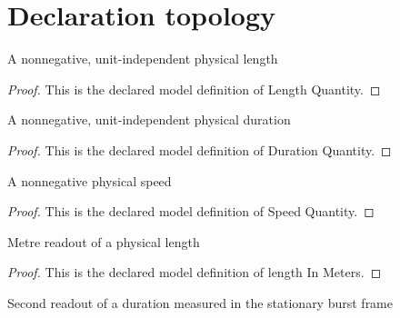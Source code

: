 \section{Declaration topology}
\begin{definition}
  \label{def:physics:phyx-mini-0594:phyxminiproblems-problemphyxmini0594-lengthquantity}
  A nonnegative, unit-independent physical length
\end{definition}
\begin{proof}
  This is the declared model definition of Length Quantity.
\end{proof}
\begin{definition}
  \label{def:physics:phyx-mini-0594:phyxminiproblems-problemphyxmini0594-durationquantity}
  A nonnegative, unit-independent physical duration
\end{definition}
\begin{proof}
  This is the declared model definition of Duration Quantity.
\end{proof}
\begin{definition}
  \label{def:physics:phyx-mini-0594:phyxminiproblems-problemphyxmini0594-speedquantity}
  A nonnegative physical speed
\end{definition}
\begin{proof}
  This is the declared model definition of Speed Quantity.
\end{proof}
\begin{definition}
  \label{def:physics:phyx-mini-0594:phyxminiproblems-problemphyxmini0594-lengthinmeters}
  Metre readout of a physical length
\end{definition}
\begin{proof}
  This is the declared model definition of length In Meters.
\end{proof}
\begin{definition}
  \label{def:physics:phyx-mini-0594:phyxminiproblems-problemphyxmini0594-durationinseconds}
  Second readout of a duration measured in the stationary burst frame
\end{definition}

